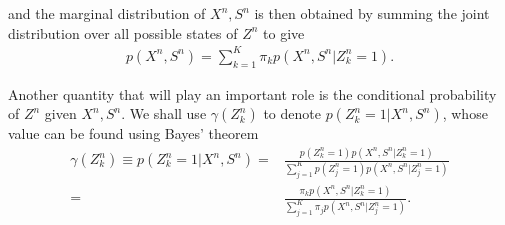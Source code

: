 \documentclass[11pt]{extarticle}
\newcommand{\0}{\mathbf{0}}
\renewcommand{\(}{\left(}
\renewcommand{\)}{\right)}
\theoremstyle{definition}
\begin{document}
and the marginal distribution of $X^{n}, S^{n}$ is then obtained by summing the joint distribution over all possible states of $Z^{n}$ to give
\begin{align*}
	p(X^{n}, S^{n}) = \sum_{k=1}^{K} \pi_{k} p(X^{n}, S^{n} \vert Z^{n}_{k}=1).
\end{align*}
\par Another quantity that will play an important role is the conditional probability of $Z^{n}$ given $X^{n}, S^{n}$. We shall use $\gamma(Z^{n}_{k})$ to denote $p(Z^{n}_{k} = 1 \vert X^{n}, S^{n})$, whose value can be found using Bayes' theorem
\begin{align*}
	\gamma(Z^{n}_{k}) \equiv p(Z^{n}_{k} = 1 \vert X^{n}, S^{n}) =& \frac{p(Z^{n}_{k}=1)p(X^{n}, S^{n} \vert Z^{n}_{k} = 1)}{\sum_{j=1}^{K}p(Z^{n}_{j}=1)p(X^{n}, S^{n} \vert Z^{n}_{j}=1)} \\
	=& \frac{\pi_{k} p(X^{n}, S^{n} \vert Z^{n}_{k} = 1)}{\sum_{j=1}^{K}\pi_{j} p(X^{n}, S^{n} \vert Z^{n}_{j}=1)}.
\end{align*}
\end{document}
